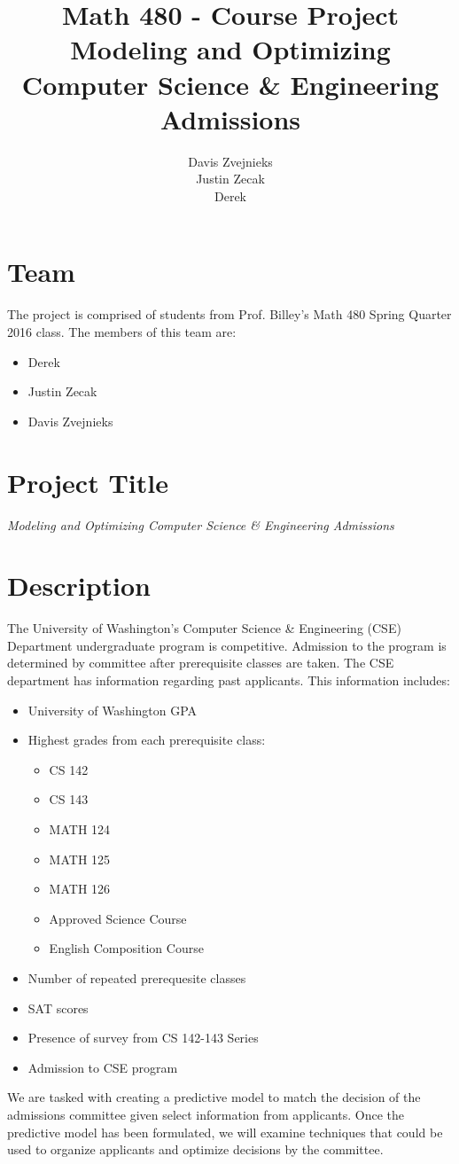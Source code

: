 \documentclass[11pt]{article}
\title{\textbf{Math 480 - Course Project}
			  \\Modeling and Optimizing
			  \\Computer Science \& Engineering Admissions}
\author{Davis Zvejnieks\\
		Justin Zecak\\
		Derek}
\date{}
\begin{document}
\maketitle

\section{Team}
The project is comprised of students from Prof. Billey's Math 480 Spring Quarter 2016 class. The members of this team are:

\begin{itemize}[noitemsep,leftmargin=1in]
\item Derek
\item Justin Zecak
\item Davis Zvejnieks
\end{itemize}



\section{Project Title}
\begin{center}
	\emph{Modeling and Optimizing Computer Science \& Engineering Admissions}
\end{center}


\section{Description}
The University of Washington's Computer Science \& Engineering (CSE) Department undergraduate program is competitive. Admission to the program is determined by committee after prerequisite classes are taken. The CSE department has information regarding past applicants. This information includes:\\
\begin{itemize}[noitemsep, leftmargin=1in]
\item University of Washington GPA
\item Highest grades from each prerequisite class:
	\begin{itemize}
	\item CS 142
	\item CS 143
	\item MATH 124
	\item MATH 125
	\item MATH 126
	\item Approved Science Course
	\item English Composition Course
	\end{itemize}
\item Number of repeated prerequesite classes
\item SAT scores
\item Presence of survey from CS 142-143 Series
\item Admission to CSE program
\end{itemize}
 We are tasked with creating a predictive model to match the decision of the admissions committee given select information from applicants. Once the predictive model has been formulated, we will examine techniques that could be used to organize applicants and optimize decisions by the committee.
\end{document}
